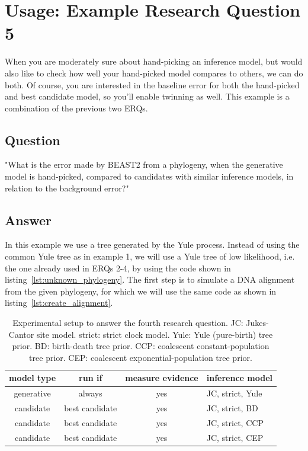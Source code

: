 \documentclass{article}
\begin{document}
\section{Usage: Example Research Question 5}

When you are moderately sure about hand-picking an inference model,
but would also like to check how well your hand-picked model compares
to others, we can do both. Of course, you are interested in the
baseline error for both the hand-picked and best candidate model,
so you'll enable twinning as well. This example is a combination
of the previous two ERQs. 

\subsection{Question}

"What is the error made by BEAST2 from a phylogeny, 
when the generative model is hand-picked, 
compared to candidates with similar inference models, 
in relation to the background error?"

\subsection{Answer}

In this example we use a tree generated by the Yule process.
Instead of using the common Yule tree as in example 1, we will use
a Yule tree of low likelihood, 
i.e. the one already used in ERQs 2-4, 
by using the code shown in listing~\ref{lst:unknown_phylogeny}.
The first step is to simulate a DNA alignment 
from the given phylogeny, for which we will use the same code 
as shown in listing~\ref{lst:create_alignment}.

\begin{table}
  \begin{tabular}{ | c | c | c | l | }
    \hline
    \textbf{model type} & \textbf{run if} & \textbf{measure evidence} & 
\textbf{inference model} \\ 
    \hline
    generative & always         & yes & JC, strict, Yule \\
    candidate  & best candidate & yes & JC, strict, BD \\
    candidate  & best candidate & yes & JC, strict, CCP \\
    candidate  & best candidate & yes & JC, strict, CEP \\
    \hline
  \end{tabular}
  \caption{
    Experimental setup to answer the fourth research question.
    JC: Jukes-Cantor site model.
    strict: strict clock model.
    Yule: Yule (pure-birth) tree prior.
    BD: birth-death tree prior.
    CCP: coalescent constant-population tree prior.
    CEP: coalescent exponential-population tree prior.
  }
  \label{tab:experiment_5}
\end{table}
\end{document}
